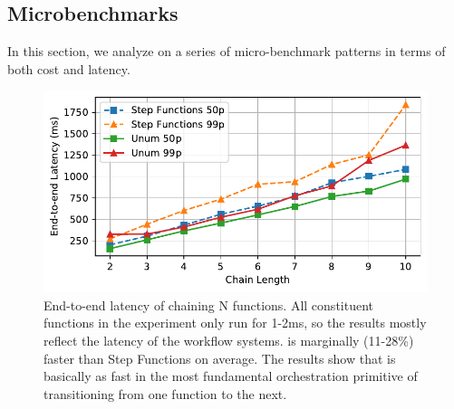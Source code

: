 

\subsection{Microbenchmarks}\label{sec:eval:micro}

In this section, we analyze \name{} on a series of micro-benchmark patterns in
terms of both cost and latency.

\begin{figure}[t!]
  \centering
  \includegraphics[width=\columnwidth]{figures/ChainMicroLatency.pdf}
  \caption{End-to-end latency of chaining N functions. All constituent
    functions in the experiment only run for 1-2ms, so the results mostly
    reflect the latency of the workflow systems. \name{} is marginally
    (11-28\%) faster than Step Functions on average. The results show that
    \name{} is basically as fast in the most fundamental orchestration
    primitive of transitioning from one function to the next.}
  \label{fig:chainmicrolatency}
\end{figure}

